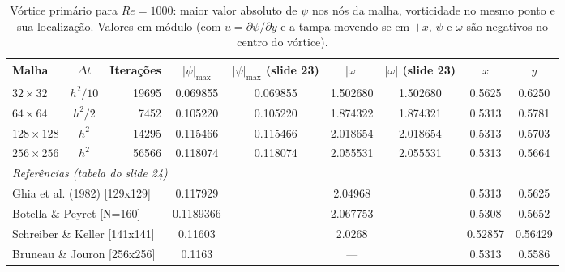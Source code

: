 \begin{table}[htbp]
\centering
\caption{Vórtice primário para $Re = 1000$: maior valor absoluto de $\psi$ nos nós da malha, vorticidade no mesmo ponto e sua localização. Valores em módulo (com $u = \partial\psi/\partial y$ e a tampa movendo-se em $+x$, $\psi$ e $\omega$ são negativos no centro do vórtice).}
\label{tab:q2b_re1000}
\footnotesize
\begin{tabular}{lcrcccccc}
\toprule
Malha & $\Delta t$ & Iterações & $|\psi|_{\max}$ & $|\psi|_{\max}$ (slide 23) & $|\omega|$ & $|\omega|$ (slide 23) & $x$ & $y$ \\
\midrule
$32\times32$ & $h^2/10$ & 19695 & 0.069855 & 0.069855 & 1.502680 & 1.502680 & 0.5625 & 0.6250 \\
$64\times64$ & $h^2/2$ & 7452 & 0.105220 & 0.105220 & 1.874322 & 1.874321 & 0.5313 & 0.5781 \\
$128\times128$ & $h^2$ & 14295 & 0.115466 & 0.115466 & 2.018654 & 2.018654 & 0.5313 & 0.5703 \\
$256\times256$ & $h^2$ & 56566 & 0.118074 & 0.118074 & 2.055531 & 2.055531 & 0.5313 & 0.5664 \\
\midrule
\multicolumn{9}{l}{\emph{Referências (tabela do slide 24)}} \\
\multicolumn{3}{l}{Ghia et al. (1982) [129x129]} & 0.117929 & & 2.04968 & & 0.5313 & 0.5625 \\
\multicolumn{3}{l}{Botella \& Peyret [N=160]} & 0.1189366 & & 2.067753 & & 0.5308 & 0.5652 \\
\multicolumn{3}{l}{Schreiber \& Keller [141x141]} & 0.11603 & & 2.0268 & & 0.52857 & 0.56429 \\
\multicolumn{3}{l}{Bruneau \& Jouron [256x256]} & 0.1163 & & --- & & 0.5313 & 0.5586 \\
\bottomrule
\end{tabular}
\end{table}
